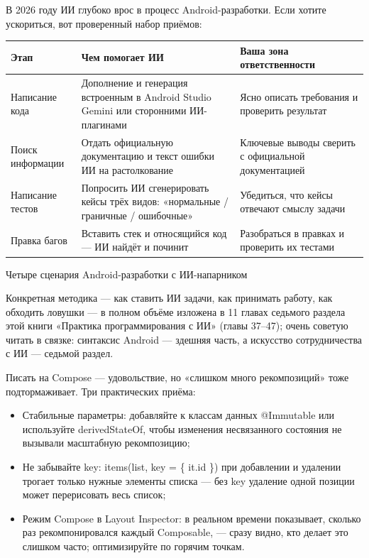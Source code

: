 
В 2026 году ИИ глубоко врос в процесс Android-разработки. Если хотите ускориться, вот проверенный набор приёмов:

\begin{center}
\begin{tabularx}{\linewidth}{|X|X|X|}
\hline
\textbf{Этап} & \textbf{Чем помогает ИИ} & \textbf{Ваша зона ответственности} \tabularnewline
\hline
Написание кода & Дополнение и генерация встроенным в Android Studio Gemini или сторонними ИИ-плагинами & Ясно описать требования и проверить результат \tabularnewline
Поиск информации & Отдать официальную документацию и текст ошибки ИИ на растолкование & Ключевые выводы сверить с официальной документацией \tabularnewline
Написание тестов & Попросить ИИ сгенерировать кейсы трёх видов: «нормальные / граничные / ошибочные» & Убедиться, что кейсы отвечают смыслу задачи \tabularnewline
Правка багов & Вставить стек и относящийся код — ИИ найдёт и починит & Разобраться в правках и проверить их тестами \tabularnewline
\hline
\end{tabularx}
\end{center}

\begin{center}\small\color{gray}Четыре сценария Android-разработки с ИИ-напарником\end{center}

Конкретная методика — как ставить ИИ задачи, как принимать работу, как обходить ловушки — в полном объёме изложена в 11 главах седьмого раздела этой книги «Практика программирования с ИИ» (главы 37–47); очень советую читать в связке: синтаксис Android — здешняя часть, а искусство сотрудничества с ИИ — седьмой раздел.


Писать на Compose — удовольствие, но «слишком много рекомпозиций» тоже подтормаживает. Три практических приёма:

\begin{itemize}
  \item Стабильные параметры: добавляйте к классам данных @Immutable или используйте derivedStateOf, чтобы изменения несвязанного состояния не вызывали масштабную рекомпозицию;
  \item Не забывайте key: items(list, key = \{ it.id \}) при добавлении и удалении трогает только нужные элементы списка — без key удаление одной позиции может перерисовать весь список;
  \item Режим Compose в Layout Inspector: в реальном времени показывает, сколько раз рекомпонировался каждый Composable, — сразу видно, кто делает это слишком часто; оптимизируйте по горячим точкам.
\end{itemize}

